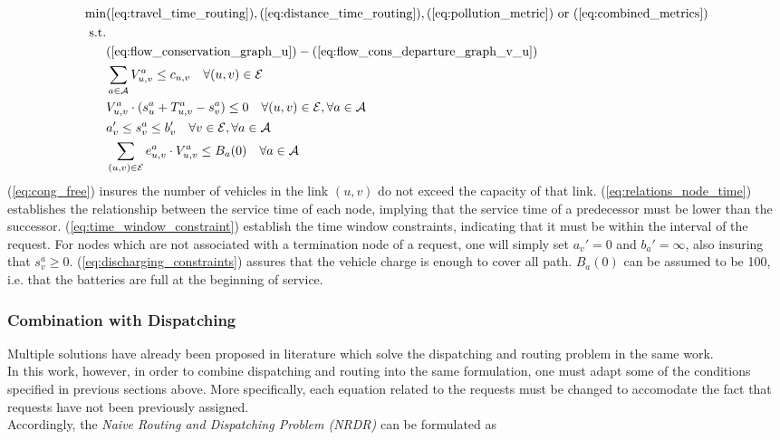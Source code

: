 \begin{align}
	\text{min}&  
		(\ref{eq:travel_time_routing}), (\ref{eq:distance_time_routing}), (\ref{eq:pollution_metric}) \text{ or } (\ref{eq:combined_metrics})
	\nonumber\\
	\text{s.t.} &\nonumber\\
	&(\ref{eq:flow_conservation_graph_u})-(\ref{eq:flow_cons_departure_graph_v_u})\nonumber\\
	&\sum_{a \in \mathcal{A}}V^a_{u,v} \leq c_{u,v} \quad \forall (u,v) \in \mathcal{E} \label{eq:cong_free}\\
	&V^a_{u,v}\cdot(s_{u}^a + T_{u,v}^a - s_{v}^a) \leq 0 \quad \forall (u,v) \in \mathcal{E}, \forall a \in \mathcal{A}\label{eq:relations_node_time}\\
	&a'_v \leq s_{v}^a \leq b'_v \quad \forall v \in \mathcal{E}, \forall a \in \mathcal{A}\label{eq:time_window_constraint}\\
	&\sum_{(u,v) \in \mathcal{E}}e^a_{u,v}\cdot V^a_{u,v} \leq B_a(0)\quad \forall a \in \mathcal{A} \label{eq:discharging_constraints}
\end{align} 
(\ref{eq:cong_free}) insures the number of vehicles in the link $(u,v)$ do not exceed the capacity of that link. (\ref{eq:relations_node_time}) establishes the relationship between the service time of each node, implying that the service time of a predecessor must be lower than the successor.  (\ref{eq:time_window_constraint}) establish the time window constraints, indicating that it must be within the interval of the request. For nodes which are not associated with a termination node of a  request, one will simply set $a_v' = 0 $ and $b_a' = \infty$, also insuring that $s_v^a \ge 0 $. (\ref{eq:discharging_constraints}) assures that the vehicle charge is enough to cover all path. $B_a(0)$ can be assumed to be 100, i.e. that the batteries are full at the beginning of service. \\
\subsubsection*{Combination with Dispatching}
Multiple solutions have already been proposed in literature which solve the dispatching and routing problem in the same work. \\
In this work, however, in order to combine dispatching and routing into the same formulation, one must adapt some of the conditions specified in previous sections above. More specifically, each equation related to the requests must be changed to accomodate the fact that requests have not been previously assigned. \\
Accordingly, the \textit{Naive Routing and Dispatching Problem (NRDR)} can be formulated as 

